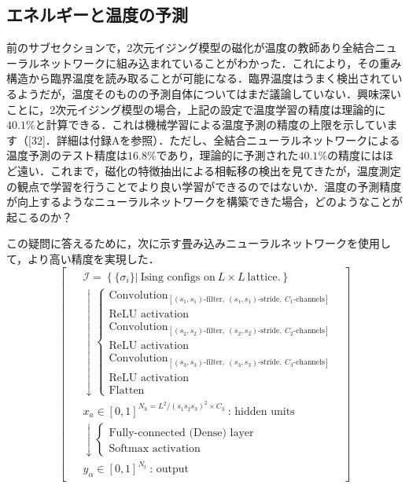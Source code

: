 \documentclass[a4paper,11pt]{jsarticle}
\begin{document}
\subsection{エネルギーと温度の予測}
前のサブセクションで，2次元イジング模型の磁化が温度の教師あり全結合ニューラルネットワークに組み込まれていることがわかった．これにより，その重み構造から臨界温度を読み取ることが可能になる．臨界温度はうまく検出されているようだが，温度そのものの予測自体についてはまだ議論していない．興味深いことに，2次元イジング模型の場合，上記の設定で温度学習の精度は理論的に$40.1\%$と計算できる．これは機械学習による温度予測の精度の上限を示しています（[32]．詳細は付録Aを参照）．ただし、全結合ニューラルネットワークによる温度予測のテスト精度は$16.8\%$であり，理論的に予測された$40.1\%$の精度にはほど遠い．これまで，磁化の特徴抽出による相転移の検出を見てきたが，温度測定の観点で学習を行うことでより良い学習ができるのではないか．温度の予測精度が向上するようなニューラルネットワークを構築できた場合，どのようなことが起こるのか？\par
この疑問に答えるために，次に示す畳み込みニューラルネットワークを使用して，より高い精度を実現した．
\begin{equation}
  \begin{bmatrix}
    \begin{aligned}
       & \mathcal{I} = \left\{ \{ \sigma_i \} \Big| \ \text{Ising configs on} \ L \times L \ \text{lattice.} \right\}        \\
       & \downarrow
      \begin{cases}
        \text{Convolution}_{[(s_1,s_1)\text{-filter}, \ (s_1,s_1)\text{-stride}, \ C_1\text{-channels}]} \\
        \text{ReLU activation}                                                                           \\
        \text{Convolution}_{[(s_2,s_2)\text{-filter}, \ (s_2,s_2)\text{-stride}, \ C_2\text{-channels}]} \\
        \text{ReLU activation}                                                                           \\
        \text{Convolution}_{[(s_3,s_3)\text{-filter}, \ (s_3,s_3)\text{-stride}, \ C_3\text{-channels}]} \\
        \text{ReLU activation}                                                                           \\
        \text{Flatten}
      \end{cases} \\
       & x_a \in [0,1]^{N_h = L^2/(s_1s_2s_3)^2 \times C_3} \ \text{: hidden units}                                          \\
       & \downarrow
      \begin{cases}
        \text{Fully-connected (Dense) layer} \\
        \text{Softmax activation}
      \end{cases}                                                                                   \\
       & y_{\alpha} \in [0,1]^{N_t} \ \text{: output}
    \end{aligned}
  \end{bmatrix}
\end{equation} \label{conv model}
\end{document}
